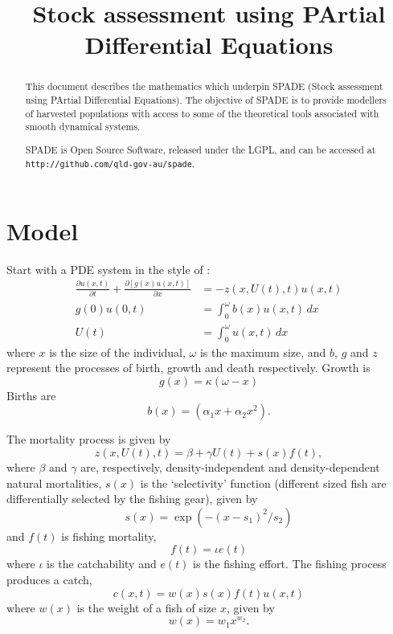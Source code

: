 \documentclass{article}
\title{Stock assessment using PArtial Differential Equations}
\author{}
\date{}
\begin{document}
\maketitle
\begin{abstract}
This document describes the mathematics which underpin SPADE (Stock assessment using PArtial Differential Equations).
The objective of SPADE is to provide modellers of
harvested populations with access to some of the theoretical
tools associated with smooth dynamical systems.

SPADE is Open Source Software, released under the LGPL, and can be accessed at\\
\verb"http://github.com/qld-gov-au/spade".
\end{abstract}

\section{Model}
Start with a PDE system in the style of \cite{Murphy1983}:
\begin{subequations}
\label{eq:1}
\begin{align}
\frac{\partial u(x,t)}{\partial t} + \frac{\partial [g(x)u(x,t)]}{\partial x} &=
-z(x,U(t),t)u(x,t) \label{eq:1.1}\\
g(0)u(0,t) &=  \int_0^{\omega} b(x) u(x,t)\,dx\label{eq:1.2}\\ 
U(t) &= \int_0^{\omega} u(x,t)\, dx
\end{align}
\end{subequations}
where $x$ is the size of the individual, $\omega$ is the maximum size, and $b$, $g$ and $z$ represent the processes of birth, growth and death respectively.  Growth is 
\begin{equation}
  g(x) = \kappa (\omega - x)\label{eq:growth}
\end{equation}
Births are
\begin{equation}
  b(x) = \left(\alpha_1 x + \alpha_2 x^2\right)\label{eq:birth}.
\end{equation}

The mortality process is given by 
\begin{equation}
  z(x,U(t),t) = \beta + \gamma U(t) + s(x)f(t)\label{seq:2a},
\end{equation}
where $\beta$ and $\gamma$ are, respectively, density-independent and density-dependent natural mortalities, $s(x)$ is the `selectivity' function (different sized fish are differentially selected by the fishing gear), given by
\begin{equation}
  s(x) = \exp(-(x-s_1)^2 / s_2)
\end{equation}
and $f(t)$ is fishing mortality, 
\begin{equation}
  f(t) = \iota e(t)  
\end{equation}
where $\iota$ is the catchability and $e(t)$ is the fishing effort.  The fishing process produces a catch,
\begin{equation}
  c(x,t) = w(x)s(x)f(t)u(x,t)
\end{equation}
where $w(x)$ is the weight of a fish of size $x$, given by
\begin{equation}
  w(x)=w_1 x^{w_2}.
\end{equation}
\end{document}
